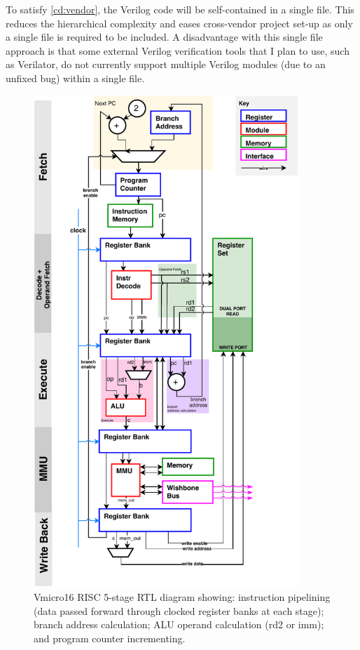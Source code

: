 \documentclass[11pt,a4paper]{report}
\begin{document}
{To satisfy \ref{cd:vendor}, the Verilog code will be self-contained in a single file. This reduces the hierarchical complexity and eases cross-vendor project set-up as only a single file is required to be included. 
A disadvantage with this single file approach is that some external Verilog verification tools that I plan to use, such as Verilator, do not currently support multiple Verilog modules (due to an unfixed bug) within a single file. 

\begin{figure}[H]
\centering 
\includegraphics[width=10cm]{../img/risc}
\caption{Vmicro16 RISC 5-stage RTL diagram showing: instruction pipelining (data passed forward through clocked register banks at each stage); branch address calculation; ALU operand calculation (rd2 or imm); and program counter incrementing.}
\label{fig:risc}
\end{figure}

}
\end{document}
